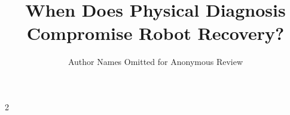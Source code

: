 \documentclass[conference]{IEEEtran}
\begin{document}
\title{When Does Physical Diagnosis Compromise Robot Recovery?}
\author{Author Names Omitted for Anonymous Review}
\maketitle

\clearpage\onecolumn
\begin{multicols}{2}


\end{multicols}
\end{document}
